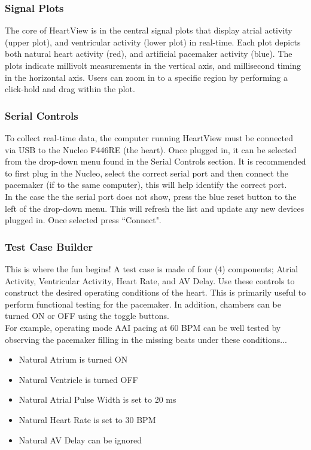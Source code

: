 \documentclass[11pt,fleqn]{book} %
\begin{document}
\subsubsection*{Signal Plots}
The core of HeartView is in the central signal plots that display atrial activity (upper plot), and ventricular activity (lower plot) in real-time. Each plot depicts both natural heart activity (red), and artificial pacemaker activity (blue). The plots indicate millivolt measurements in the vertical axis, and millisecond timing in the horizontal axis. Users can zoom in to a specific region by performing a click-hold and drag within the plot. 

\subsubsection*{Serial Controls} 
To collect real-time data, the computer running HeartView must be connected via USB to the Nucleo F446RE (the heart). Once plugged in, it can be selected from the drop-down menu found in the Serial Controls section. It is recommended to first plug in the Nucleo, select the correct serial port and then connect the pacemaker (if to the same computer), this will help identify the correct port. \\

In the case the the serial port does not show, press the blue reset button to the left of the drop-down menu. This will refresh the list and update any new devices plugged in. Once selected press ``Connect". 


\subsubsection*{Test Case Builder} 
This is where the fun begins! A test case is made of four (4) components; Atrial Activity, Ventricular Activity, Heart Rate, and AV Delay. Use these controls to construct the desired operating conditions of the heart. This is primarily useful to perform functional testing for the pacemaker. In addition, chambers can be turned ON or OFF using the toggle buttons. \\

For example, operating mode AAI pacing at 60 \ac{BPM}  can be well tested by observing the pacemaker filling in the missing beats under these conditions... \\

\begin{itemize}
	\item Natural Atrium is turned ON
	\item Natural Ventricle is turned OFF
	\item Natural Atrial Pulse Width is set to 20 ms
	\item Natural Heart Rate is set to 30 BPM
	\item Natural AV Delay can be ignored 
\end{itemize}
\end{document}
